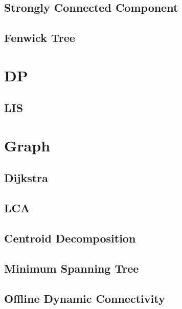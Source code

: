 \documentclass[9pt,landscape,a4paper,twocolumn]{extarticle}
\begin{document}
\subsection{Strongly Connected Component}


\subsection{Fenwick Tree}


\section{DP}

\subsection{LIS}


\section{Graph}

\subsection{Dijkstra}


\subsection{LCA}


\subsection{Centroid Decomposition}


\subsection{Minimum Spanning Tree}


\subsection{Offline Dynamic Connectivity}

\end{document}
